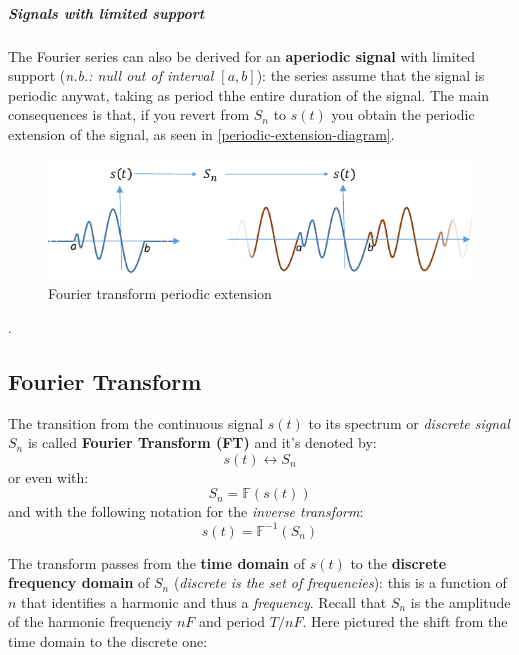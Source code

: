 \documentclass[10pt,a4paper]{report}
\theoremstyle{definition}
\begin{document}
\subparagraph{Signals with limited support}
The Fourier series can also be derived for an \textbf{aperiodic signal} with limited support (\textit{n.b.: null out of interval $[a,b]$}): the series assume that the signal is periodic anywat, taking as period thhe entire duration of the signal. The main consequences is that, if you revert from $S_{n}$ to $s(t)$ you obtain the periodic extension of the signal, as seen in \ref{periodic-extension-diagram}.

\begin{figure}[h]
	\centering\includegraphics[scale=0.50]{images/Pasted image 20230511150144.png}
	\caption{Fourier transform periodic extension}
	\label{fourier-transform-periodic-extension}
	
\end{figure}

.

\subsection{Fourier Transform}
The transition from the continuous signal $s(t)$ to its spectrum or \textit{discrete signal} $S_{n}$ is called \textbf{Fourier Transform (FT)} and it's denoted by:
\begin{equation}
	s(t) \longleftrightarrow S_{n}
\end{equation}
or even with:
\begin{equation}
	S_{n} = \mathbb{F}(s(t))
\end{equation}
and with the following notation for the \textit{inverse transform}:
\begin{equation}
	s(t) = \mathbb{F}^{-1}(S_{n})
\end{equation}

The transform passes from the \textbf{time domain} of $s(t)$ to the \textbf{discrete frequency domain} of $S_{n}$ (\textit{discrete is the set of frequencies}): this is a function of $n$ that identifies a harmonic and thus a \textit{frequency}. Recall that $S_{n}$ is the amplitude of the harmonic frequenciy $nF$ and period $T/nF$. 
Here pictured the shift from the time domain to the discrete one:
\end{document}
